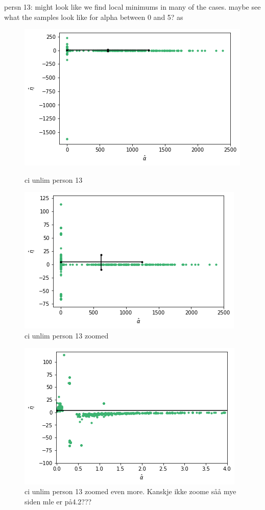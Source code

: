 persn 13: might look like we find local minimums in many of the cases. 
maybe see what the samples look like for alpha between 0 and 5? as 
\begin{figure}
    \centering
    \begin{minipage}{0.48\textwidth}
        \centering
        \includegraphics[scale=0.37]{pictures/ci_unlim_person13.png}
        \caption{ci unlim person 13}
        \label{fig:ci_unlim_person_13}
    \end{minipage}\hfill
    \begin{minipage}{0.48\textwidth}
        \centering
        \includegraphics[scale=0.37]{pictures/ci_unlim_person13_zoomed.png}
        \caption{ci unlim person 13 zoomed}
        \label{fig:ci_unlim_person_13_zoomed}
    \end{minipage}
\end{figure}
\begin{figure}
    \centering
    \includegraphics[scale=0.7]{pictures/ci_unlim_person13_zoomed2.png}
    \caption{ci unlim person 13 zoomed even more. Kanskje ikke zoome såå mye siden mle er på4.2???}
    \label{fig:ci_unlim_person_13_zoomed2}
\end{figure}

